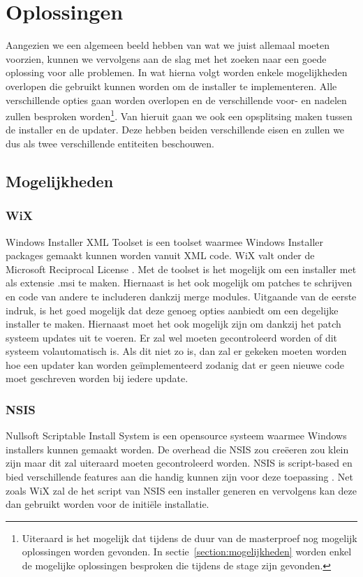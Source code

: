 \documentclass{article}
\begin{document}
\section{Oplossingen}
Aangezien we een algemeen beeld hebben van wat we juist allemaal moeten voorzien, kunnen we vervolgens aan de slag met het zoeken naar een goede oplossing voor alle problemen.
In wat hierna volgt worden enkele mogelijkheden overlopen die gebruikt kunnen worden om de installer te implementeren.
Alle verschillende opties gaan worden overlopen en de verschillende voor- en nadelen zullen besproken worden\footnote{Uiteraard is het mogelijk dat tijdens de duur van de masterproef nog mogelijk oplossingen worden gevonden.
In sectie~\vref{section:mogelijkheden} worden enkel de mogelijke oplossingen besproken die tijdens de stage zijn gevonden.}.
Van hieruit gaan we ook een opsplitsing maken tussen de installer en de updater.
Deze hebben beiden verschillende eisen en zullen we dus als twee verschillende entiteiten beschouwen.

\subsection{Mogelijkheden}\label{section:mogelijkheden}
\subsubsection{WiX \citep{wixMain}}
Windows Installer XML Toolset is een toolset waarmee Windows Installer packages gemaakt kunnen worden vanuit XML code.
WiX valt onder de Microsoft Reciprocal License \citep{wixLicense}.
Met de toolset is het mogelijk om een installer met als extensie .msi te maken.
Hiernaast is het ook mogelijk om patches te schrijven en code van andere te includeren dankzij merge modules\citep{wixMergers}.
Uitgaande van de eerste indruk, is het goed mogelijk dat deze genoeg opties aanbiedt om een degelijke installer te maken.
Hiernaast moet het ook mogelijk zijn om dankzij het patch systeem updates uit te voeren.
Er zal wel moeten gecontroleerd worden of dit systeem volautomatisch is.
Als dit niet zo is, dan zal er gekeken moeten worden hoe een updater kan worden ge\"implementeerd zodanig dat er geen nieuwe code moet geschreven worden bij iedere update.

\subsubsection{NSIS \citep{nsisMain}}
Nullsoft Scriptable Install System is een opensource systeem waarmee Windows installers kunnen gemaakt worden.
De overhead die NSIS zou cre\"eeren zou klein zijn maar dit zal uiteraard moeten gecontroleerd worden. 
NSIS is script-based en bied verschillende features aan die handig kunnen zijn voor deze toepassing \citep{nsisFeatures}.
Net zoals WiX zal de het script van NSIS een installer generen en vervolgens kan deze dan gebruikt worden voor de initi\"ele installatie.
\end{document}
